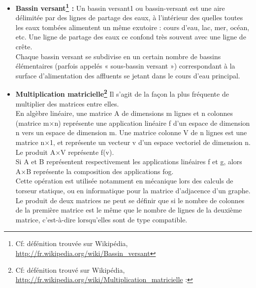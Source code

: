 \begin{itemize}
	\item{\textbf{Bassin versant\footnote{Cf: défénition trouvée sur Wikipédia, \url{http://fr.wikipedia.org/wiki/Bassin_versant}} :} Un bassin versant1 ou bassin-versant est une aire délimitée par des lignes de partage des eaux, à l'intérieur des quelles toutes les eaux tombées alimentent un même exutoire : cours d'eau, lac, mer, océan, etc. Une ligne de partage des eaux ce confond très souvent avec une ligne de crête.\\

	Chaque bassin versant se subdivise en un certain nombre de bassins élémentaires (parfois appelés « sous-bassin versant ») correspondant à la surface d'alimentation des affluents se jetant dans le cours d'eau principal.\\}

	\item{\textbf{Multiplication matricielle\footnote{Cf: défénition trouvé sur Wikipédia, \url{http://fr.wikipedia.org/wiki/Multiplication_matricielle} :}} Il s'agit de la façon la plus fréquente de multiplier des matrices entre elles.\\
	En algèbre linéaire, une matrice A de dimensions m lignes et n colonnes (matrice m×n) représente une application linéaire f d'un espace de dimension n vers un espace de dimension m. Une matrice colonne V de n lignes est une matrice n×1, et représente un vecteur v d'un espace vectoriel de dimension n. Le produit A×V représente f(v).\\
	Si A et B représentent respectivement les applications linéaires f et g, alors A×B représente la composition des applications fog.\\
	Cette opération est utilisée notamment en mécanique lors des calculs de torseur statique, ou en informatique pour la matrice d'adjacence d'un graphe. \\
	Le produit de deux matrices ne peut se définir que si le nombre de colonnes de la première matrice est le même que le nombre de lignes de la deuxième matrice, c'est-à-dire lorsqu'elles sont de type compatible. \\}


\end{itemize}
